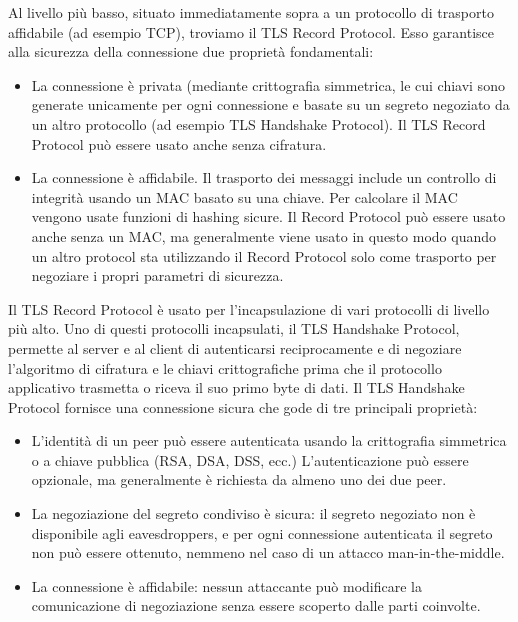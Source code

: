Al livello più basso, situato immediatamente sopra a un protocollo di trasporto affidabile (ad esempio TCP), troviamo il TLS Record Protocol.
Esso garantisce alla sicurezza della connessione due proprietà fondamentali:
\begin{itemize}
\item La connessione è privata (mediante crittografia simmetrica, le cui chiavi sono generate unicamente per ogni connessione e basate su un segreto negoziato da un altro protocollo (ad esempio TLS Handshake Protocol).
Il TLS Record Protocol può essere usato anche senza cifratura.
\item La connessione è affidabile. Il trasporto dei messaggi include un controllo di integrità usando un MAC basato su una chiave. Per calcolare il MAC vengono usate funzioni di hashing sicure. Il Record Protocol può essere usato anche senza un MAC, ma generalmente viene usato in questo modo quando un altro protocol sta utilizzando il Record Protocol solo come trasporto per negoziare i propri parametri di sicurezza.
\end{itemize}
Il TLS Record Protocol è usato per l'incapsulazione di vari protocolli di livello più alto. Uno di questi protocolli incapsulati, il TLS Handshake Protocol, permette al server e al client di autenticarsi reciprocamente e di negoziare l'algoritmo di cifratura e le chiavi crittografiche prima che il protocollo applicativo trasmetta o riceva il suo primo byte di dati. Il TLS Handshake Protocol fornisce una connessione sicura che gode di tre principali proprietà:
\begin{itemize}
\item L'identità di un peer può essere autenticata usando la crittografia simmetrica o a chiave pubblica (RSA, DSA, DSS, ecc.) L'autenticazione può essere opzionale, ma generalmente è richiesta da almeno uno dei due peer.
\item La negoziazione del segreto condiviso è sicura: il segreto negoziato non è disponibile agli eavesdroppers, e per ogni connessione autenticata il segreto non può essere ottenuto, nemmeno nel caso di un attacco man-in-the-middle.
\item La connessione è affidabile: nessun attaccante può modificare la comunicazione di negoziazione senza essere scoperto dalle parti coinvolte.
\end{itemize}




